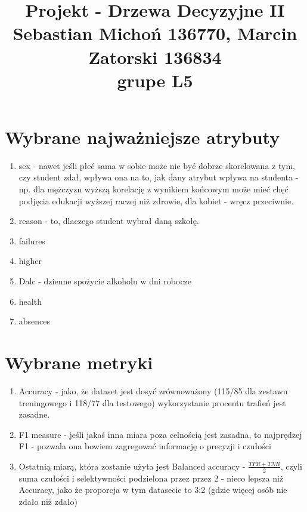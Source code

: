 \documentclass[12pt]{article}
\begin{document}
\title{Projekt - Drzewa Decyzyjne II\\
\large Sebastian Michoń 136770, Marcin Zatorski 136834\\
\large grupe L5}
\date{\vspace{-10ex}}
\maketitle

\section{Wybrane najważniejsze atrybuty}
\begin{enumerate}
	\item sex - nawet jeśli płeć sama w sobie może nie być dobrze skorelowana z tym, czy student zdał, wpływa ona na to, jak dany atrybut wpływa na studenta - np. dla mężczyzn wyższą korelację z wynikiem końcowym może mieć chęć podjęcia edukacji wyższej raczej niż zdrowie, dla kobiet - wręcz przeciwnie.
	
	\item reason - to, dlaczego student wybrał daną szkołę.
	\item failures
	\item higher
	\item Dalc - dzienne spożycie alkoholu w dni robocze
	\item health
	\item absences	
\end{enumerate}

\section{Wybrane metryki}
\begin{enumerate}
	\item Accuracy - jako, że dataset jest dosyć zrównoważony (115/85 dla zestawu treningowego i 118/77 dla testowego) wykorzystanie procentu trafień jest zasadne.
	\item F1 measure - jeśli jakaś inna miara poza celnością jest zasadna, to najprędzej F1 - pozwala ona bowiem zagregować informację o precyzji i czułości
	\item Ostatnią miarą, która zostanie użyta jest Balanced accuracy - \(\frac{TPR+TNR}{2}\), czyli suma czułości i selektywności podzielona przez przez 2 - nieco lepsza niż Accuracy, jako że proporcja w tym datasecie to 3:2 (gdzie więcej osób nie zdało niż zdało)
\end{enumerate}
\end{document}
